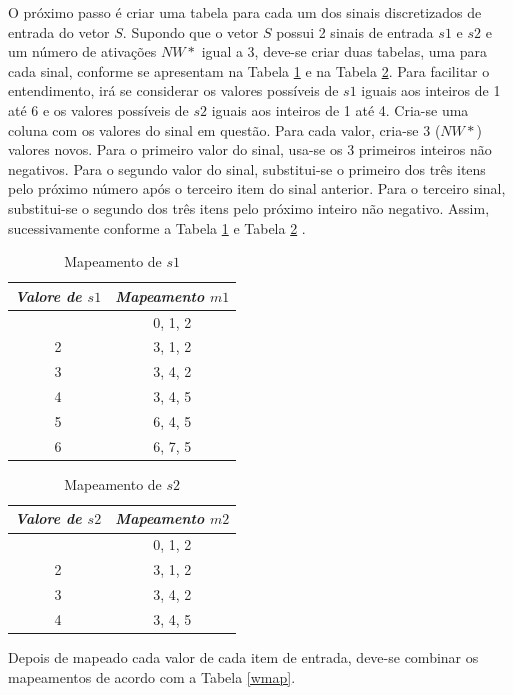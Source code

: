O próximo passo é criar uma tabela para cada um dos sinais discretizados de entrada do vetor $S$. 
Supondo que o vetor $S$ possui 2 sinais de entrada $s1$ e $s2$ e um número de ativações $NW*$ igual a 3, deve-se criar duas tabelas, uma para cada sinal, conforme se apresentam na Tabela \ref{disc_s1} e na Tabela \ref{disc_s2}. 
Para facilitar o entendimento, irá se considerar os valores possíveis de $s1$ iguais aos inteiros de 1 até 6 e os valores possíveis de $s2$ iguais aos inteiros de 1 até 4.
Cria-se uma coluna com os valores do sinal em questão. 
Para cada valor, cria-se 3 ($NW*$) valores novos. 
Para o primeiro valor do sinal, usa-se os 3 primeiros inteiros não negativos.
Para o segundo valor do sinal, substitui-se o primeiro dos três itens pelo próximo número após o terceiro item do sinal anterior. 
Para o terceiro sinal, substitui-se o segundo dos três itens pelo próximo inteiro não negativo.
Assim, sucessivamente conforme a Tabela \ref{disc_s1} e Tabela \ref{disc_s2} \cite{Albus1975b}.
\begin{table}[ht]
	\centering
	\caption{Mapeamento de $s1$}
	\label{disc_s1}
	\ABNTEXfontereduzida
	\begin{tabular}{c c}
		\toprule
		\textit{Valore de $s1$} & \textit{Mapeamento $m1$}\\
		\midrule
		\ABNTEXfontereduzida
		1 & 0, 1, 2 \\
		2 & 3, 1, 2 \\
		3 & 3, 4, 2 \\
		4 & 3, 4, 5 \\
		5 & 6, 4, 5 \\
		6 & 6, 7, 5 \\
		\bottomrule
	\end{tabular}
\end{table}
\begin{table}[ht]
	\centering
	\caption{Mapeamento de $s2$}
	\label{disc_s2}
	\ABNTEXfontereduzida
	\begin{tabular}{c c}
		\toprule
		\textit{Valore de $s2$} & \textit{Mapeamento $m2$}\\
		\midrule
		\ABNTEXfontereduzida
		1 & 0, 1, 2 \\
		2 & 3, 1, 2 \\
		3 & 3, 4, 2 \\
		4 & 3, 4, 5 \\
		\bottomrule
	\end{tabular}
\end{table}


Depois de mapeado cada valor de cada item de entrada, deve-se combinar os mapeamentos de acordo com a Tabela \ref{wmap}.

